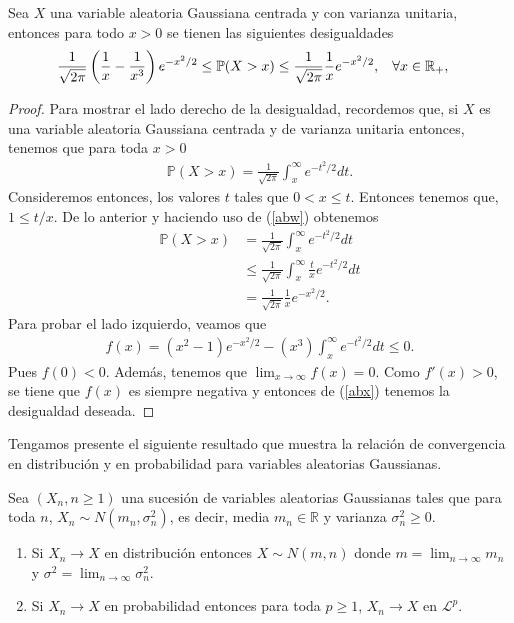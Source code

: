 \begin{proposition}
Sea $X$ una variable aleatoria Gaussiana centrada y con varianza unitaria, entonces para todo $x > 0$ se tienen las siguientes desigualdades %
	\begin{align*}
	\frac{1}{\sqrt{2 \pi}} \left( \frac{1}{x} - \frac{1}{x^3} \right) e^{-x^2 / 2} \leq \mathbb{P} (X & > x) \leq \frac{1}{\sqrt{2 \pi}} \frac{1}{x} e^{-x^2 / 2}, \hspace{0.3 cm} \forall x \in \mathbb{R}_{+}, 	
	\end{align*}
\end{proposition}
\begin{proof}
Para mostrar el lado derecho de la desigualdad, recordemos que, si $X$ es una variable aleatoria Gaussiana centrada y de varianza unitaria entonces, tenemos que para toda $x > 0$
	\begin{align}
	\mathbb{P} (X > x) = \frac{1}{\sqrt{2 \pi}} \int_x^{\infty} e^{-t^2 / 2} dt. \label{abw}
	\end{align}
Consideremos entonces, los valores $t$ tales que $0 < x \leq t$. Entonces tenemos que, $1 \leq t/x$. De lo anterior y haciendo uso de (\ref{abw}) obtenemos
	\begin{align*}
	\mathbb{P} (X > x) & = \frac{1}{\sqrt{2 \pi}} \int_x^{\infty} e^{-t^2 / 2} dt \\
	& \leq \frac{1}{\sqrt{2 \pi}} \int_x^{\infty} \frac{t}{x} e^{-t^2 / 2} dt \\
	& = \frac{1}{\sqrt{2 \pi}} \frac{1}{x} e^{-x^2 / 2}.
	\end{align*}
Para probar el lado izquierdo, veamos que 
	\begin{align}
	f(x) = (x^2 - 1) e^{-x^2 / 2} - (x^3) \int_x^{\infty} e^{-t^2 / 2} dt \leq 0. \label{abx}
	\end{align}
Pues $f(0) < 0$. Además, tenemos que $\lim_{x \rightarrow \infty} f(x) = 0$. Como $f'(x) > 0$, se tiene que  $f(x)$ es siempre negativa y entonces de (\ref{abx}) tenemos la desigualdad deseada.
\end{proof}

Tengamos presente el siguiente resultado que muestra la relación de convergencia en distribución y en probabilidad para variables aleatorias Gaussianas.

\begin{theorem}
Sea $(X_n, n \geq 1)$ una sucesión de variables aleatorias Gaussianas tales que para toda $n$, $X_n \sim N(m_n, \sigma_n^2)$, es decir, media $m_n \in \mathbb{R}$ y varianza $\sigma_n^2 \geq 0$.
	\begin{enumerate}
	\item Si $X_n \rightarrow X$ en distribución entonces $X \sim N(m, n)$ donde $m = \lim_{n \rightarrow \infty} m_n$ y $\sigma^2 = \lim_{n \rightarrow \infty} \sigma_n^2$.
	\item Si $X_n \rightarrow X$ en probabilidad entonces para toda $p \geq 1$, $X_n \rightarrow X$ en $\mathcal{L}^p$.
	\end{enumerate}
\end{theorem}

